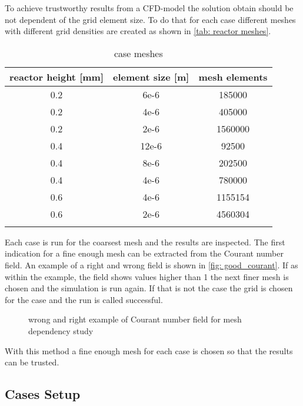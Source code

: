 \documentclass[../thesis.tex]{subfiles}
\begin{document}
To achieve trustworthy results from a CFD-model the solution obtain should be not dependent of the grid element size. 
To do that for each case different meshes with different grid densities are created as shown in \autoref{tab: reactor meshes}.
\begin{table} [htb]
	\centering
	\caption{case meshes}
	\begin{tabular}{ ccc }
		\hline
		reactor height [mm] & element size [m] & mesh elements \\
		\hline
		0.2 & 6e-6 & 185000\\
		0.2 & 4e-6 & 405000\\
		0.2 & 2e-6 & 1560000\\
		0.4 & 12e-6 & 92500\\
		0.4 & 8e-6 & 202500\\
		0.4 & 4e-6 & 780000\\
		0.6 & 4e-6 & 1155154\\
		0.6 & 2e-6 & 4560304\\
		\hline		
		\label{tab: reactor meshes}
	\end{tabular}
\end{table}
Each case is run for the coarsest mesh and the results are inspected. The first indication for a fine enough mesh can be extracted from the Courant number field. An example of a right and wrong field is shown in \autoref{fig: good_courant}. If as within the example, the field shows values higher than 1 the next finer mesh is chosen and the simulation is run again. If that is not the case the grid is chosen for the case and the run is called successful.

\begin{figure}[htb]
	\centering
	\qquad
	\caption{wrong and right example of Courant number field for mesh dependency study}
	\label{fig: good_courant}
\end{figure}
With this method a fine enough mesh for each case is chosen so that the results can be trusted.

\subsection{Cases Setup}
\end{document}
